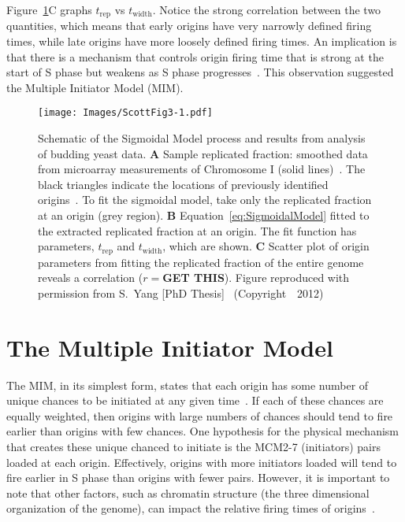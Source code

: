 {	Figure~\ref{fig:SigmoidalModel}C graphs $t_{\text{rep}}$ vs $t_{\text{width}}$.
	Notice the strong correlation between the two quantities, which means that early origins have very narrowly defined firing times, while late origins have more loosely defined firing times.
	An implication is that there is a mechanism that controls origin firing time that is strong at the start of S phase but weakens as S phase progresses~\cite{ScottsThesis}.
	This observation suggested the Multiple Initiator Model (MIM).
	
	\begin{figure}[tbh]
		\begin{center}
			\texttt{[image: Images/ScottFig3-1.pdf]}
		\end{center}
			\caption[Sigmoidal model]{\label{fig:SigmoidalModel} Schematic of the Sigmoidal Model process and results from analysis of budding yeast data.
				\textbf{A} Sample replicated fraction: smoothed data from microarray measurements of Chromosome I (solid lines)~\cite{McCuneMicroArray}.
				The black triangles indicate the locations of previously identified origins~\cite{OriginLocations}.
				To fit the sigmoidal model, take only the replicated fraction at an origin (grey region).
				\textbf{B} Equation~\ref{eq:SigmoidalModel} fitted to the extracted replicated fraction at an origin.
				The fit function has parameters, $t_{\text{rep}}$ and $t_{\text{width}}$, which are shown.
				\textbf{C} Scatter plot of origin parameters from fitting the replicated fraction of the entire genome reveals a correlation ($r=$\textbf{GET THIS}).
				Figure reproduced with permission from S.~Yang [PhD Thesis]~\cite{ScottsThesis} (Copyright~\textcopyright~2012)}
	\end{figure}
	
	
	\section{The Multiple Initiator Model}
	\label{sec:MIM}
	
	The MIM, in its simplest form, states that each origin has some number of unique chances to be initiated at any given time~\cite{ScottsThesis}.
	If each of these chances are equally weighted, then origins with large numbers of chances should tend to fire earlier than origins with few chances.
	One hypothesis for the physical mechanism that creates these unique chanced to initiate is the MCM2-7 (initiators) pairs loaded at each origin.
	Effectively, origins with more initiators loaded will tend to fire earlier in S phase than origins with fewer pairs.
	However, it is important to note that other factors, such as chromatin structure (the three dimensional organization of the genome), can impact the relative firing times of origins~\cite{Chromatin}.
	
}
